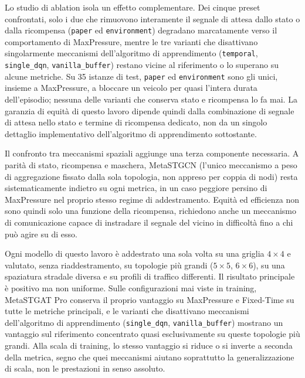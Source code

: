Lo studio di ablation isola un effetto complementare. Dei cinque preset
confrontati, solo i due che rimuovono interamente il segnale di attesa
dallo stato o dalla ricompensa (\texttt{paper} ed \texttt{environment})
degradano marcatamente verso il comportamento di MaxPressure, mentre le
tre varianti che disattivano singolarmente meccanismi dell'algoritmo di
apprendimento (\texttt{temporal}, \texttt{single\_dqn},
\texttt{vanilla\_buffer}) restano vicine al riferimento o lo superano su
alcune metriche. Su 35 istanze di test, \texttt{paper} ed
\texttt{environment} sono gli unici, insieme a MaxPressure, a bloccare un
veicolo per quasi l'intera durata dell'episodio; nessuna delle varianti
che conserva stato e ricompensa lo fa mai. La garanzia di equità di questo
lavoro dipende quindi dalla combinazione di segnale di attesa nello stato
e termine di ricompensa dedicato, non da un singolo dettaglio
implementativo dell'algoritmo di apprendimento sottostante.

Il confronto tra meccanismi spaziali aggiunge una terza componente
necessaria. A parità di stato, ricompensa e maschera, MetaSTGCN (l'unico
meccanismo a peso di aggregazione fissato dalla sola topologia, non
appreso per coppia di nodi) resta sistematicamente indietro su ogni
metrica, in un caso peggiore persino di MaxPressure nel proprio stesso
regime di addestramento. Equità ed efficienza non sono quindi solo una
funzione della ricompensa, richiedono anche un meccanismo di
comunicazione capace di instradare il segnale del vicino in difficoltà
fino a chi può agire su di esso.

Ogni modello di questo lavoro è addestrato una sola volta su una griglia
$4\times4$ e valutato, senza riaddestramento, su topologie più grandi
($5\times5$, $6\times6$), su una spaziatura stradale diversa e su profili
di traffico differenti. Il risultato principale è positivo ma non
uniforme. Sulle configurazioni mai viste in training, MetaSTGAT Pro
conserva il proprio vantaggio su MaxPressure e Fixed-Time su tutte le
metriche principali, e le varianti che disattivano meccanismi
dell'algoritmo di apprendimento (\texttt{single\_dqn},
\texttt{vanilla\_buffer}) mostrano un vantaggio sul riferimento
concentrato quasi esclusivamente su queste topologie più grandi. Alla
scala di training, lo stesso vantaggio si riduce o si inverte a seconda
della metrica, segno che quei meccanismi aiutano soprattutto la
generalizzazione di scala, non le prestazioni in senso assoluto.

